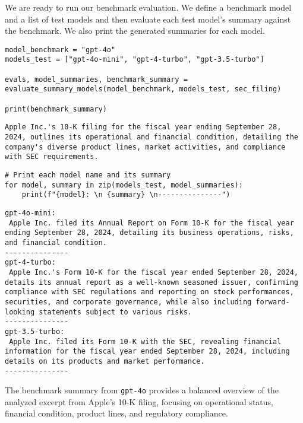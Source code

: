 We are ready to run our benchmark evaluation. We define a benchmark model and a list of test models and then evaluate each test model's summary against the benchmark. We also print the generated summaries for each model.

\begin{verbatim}
model_benchmark = "gpt-4o"
models_test = ["gpt-4o-mini", "gpt-4-turbo", "gpt-3.5-turbo"]

evals, model_summaries, benchmark_summary = evaluate_summary_models(model_benchmark, models_test, sec_filing)

print(benchmark_summary)
\end{verbatim}



    \begin{verbatim}
Apple Inc.'s 10-K filing for the fiscal year ending September 28, 2024, outlines its operational and financial condition, detailing the company's diverse product lines, market activities, and compliance with SEC requirements.
    \end{verbatim}



\begin{verbatim}
# Print each model name and its summary
for model, summary in zip(models_test, model_summaries):
    print(f"{model}: \n {summary} \n---------------")
\end{verbatim}

\begin{verbatim}
gpt-4o-mini: 
 Apple Inc. filed its Annual Report on Form 10-K for the fiscal year ending September 28, 2024, detailing its business operations, risks, and financial condition. 
---------------
gpt-4-turbo: 
 Apple Inc.'s Form 10-K for the fiscal year ended September 28, 2024, details its annual report as a well-known seasoned issuer, confirming compliance with SEC regulations and reporting on stock performances, securities, and corporate governance, while also including forward-looking statements subject to various risks. 
---------------
gpt-3.5-turbo: 
 Apple Inc. filed its Form 10-K with the SEC, revealing financial information for the fiscal year ended September 28, 2024, including details on its products and market performance. 
---------------
\end{verbatim}


The benchmark summary from \texttt{gpt-4o} provides a balanced overview of the analyzed excerpt from Apple's 10-K filing, focusing on operational status, financial condition, product lines, and regulatory compliance.


